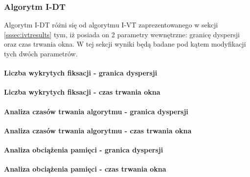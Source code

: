 \subsubsection{Algorytm I-DT}
\label{sssec:idtresults}
Algorytm I-DT różni się od algorytmu I-VT zaprezentowanego w sekcji \ref{sssec:ivtresults} tym, iż posiada on 2 parametry wewnętrzne: granicę dyspersji oraz czas trwania okna. W tej sekcji wyniki będą badane pod kątem modyfikacji tych dwóch parametrów. 
\paragraph{Liczba wykrytych fiksacji - granica dyspersji\\}
\paragraph{Liczba wykrytych fiksacji - czas trwania okna\\}
\paragraph{Analiza czasów trwania algorytmu - granica dyspersji\\}
\paragraph{Analiza czasów trwania algorytmu - czas trwania okna\\}
\paragraph{Analiza obciążenia pamięci - granica dyspersji\\}
\paragraph{Analiza obciążenia pamięci - czas trwania okna\\}
